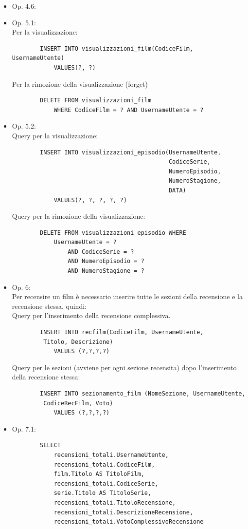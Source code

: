 \documentclass[a4paper,12pt]{report}
\begin{document}
\begin{itemize}
	\item Op. 4.6: 
	\item Op. 5.1:\\
	Per la visualizzazione:
	\begin{verbatim}
		INSERT INTO visualizzazioni_film(CodiceFilm, UsernameUtente)
			VALUES(?, ?)
	\end{verbatim}
	Per la rimozione della visualizzazione (forget)
	\begin{verbatim}
		DELETE FROM visualizzazioni_film 
			WHERE CodiceFilm = ? AND UsernameUtente = ?
	\end{verbatim}
	\item Op. 5.2:\\
	Query per la visualizzazione:
	\begin{verbatim}
		INSERT INTO visualizzazioni_episodio(UsernameUtente,
											 CodiceSerie,
											 NumeroEpisodio,
											 NumeroStagione,
											 DATA)
			VALUES(?, ?, ?, ?, ?)
	\end{verbatim}
	Query per la rimozione della visualizzazione:
	\begin{verbatim}
		DELETE FROM visualizzazioni_episodio WHERE
			UsernameUtente = ? 
				AND CodiceSerie = ? 
				AND NumeroEpisodio = ? 
				AND NumeroStagione = ?
	\end{verbatim}
	\item Op. 6:\\
	Per recensire un film è necessario inserire tutte le sezioni della recensione e la recensione stessa, quindi:\\
	Query per l'inserimento della recensione complessiva.
	\begin{verbatim}
		INSERT INTO recfilm(CodiceFilm, UsernameUtente,
		 Titolo, Descrizione)
			VALUES (?,?,?,?)
	\end{verbatim}
	Query per le sezioni (avviene per ogni sezione recensita) dopo l'inserimento della recensione stessa:
	\begin{verbatim}
		INSERT INTO sezionamento_film (NomeSezione, UsernameUtente,
		 CodiceRecFilm, Voto)
			VALUES (?,?,?,?)
	\end{verbatim}
	\item Op. 7.1:
	\begin{verbatim}
		SELECT
			recensioni_totali.UsernameUtente,
			recensioni_totali.CodiceFilm,
			film.Titolo AS TitoloFilm,
			recensioni_totali.CodiceSerie,
			serie.Titolo AS TitoloSerie,
			recensioni_totali.TitoloRecensione,
			recensioni_totali.DescrizioneRecensione,
			recensioni_totali.VotoComplessivoRecensione

\end{verbatim}
\end{itemize}
\end{document}
